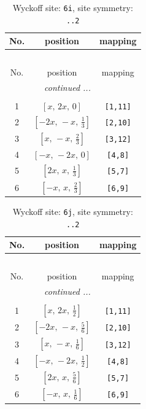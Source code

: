 \documentclass[fleqn,8pt]{jsarticle}
\begin{document}
\renewcommand{\arraystretch}{1.2}
\begin{longtable}{ccc}
\caption{Wyckoff site: {\tt 6i}, site symmetry: {\tt ..2}}
 \\
 \hline \hline
No. & position & mapping \\ \hline \endfirsthead

\multicolumn{2}{l}{\tablename\ \thetable{}} \\
 \hline \hline
No. & position & mapping \\ \hline \endhead

 \hline \hline
\multicolumn{2}{r}{\footnotesize\it continued ...} \\ \endfoot

 \hline \hline
\multicolumn{2}{r}{} \\ \endlastfoot

1 & $\left[ x,\, 2 x,\, 0 \right]$ & {\tt [1,11]} \\ \hline
2 & $\left[ - 2 x,\, - x,\, \frac{1}{3} \right]$ & {\tt [2,10]} \\ \hline
3 & $\left[ x,\, - x,\, \frac{2}{3} \right]$ & {\tt [3,12]} \\ \hline
4 & $\left[ - x,\, - 2 x,\, 0 \right]$ & {\tt [4,8]} \\ \hline
5 & $\left[ 2 x,\, x,\, \frac{1}{3} \right]$ & {\tt [5,7]} \\ \hline
6 & $\left[ - x,\, x,\, \frac{2}{3} \right]$ & {\tt [6,9]} \\
\end{longtable}
\renewcommand{\arraystretch}{1.2}
\begin{longtable}{ccc}
\caption{Wyckoff site: {\tt 6j}, site symmetry: {\tt ..2}}
 \\
 \hline \hline
No. & position & mapping \\ \hline \endfirsthead

\multicolumn{2}{l}{\tablename\ \thetable{}} \\
 \hline \hline
No. & position & mapping \\ \hline \endhead

 \hline \hline
\multicolumn{2}{r}{\footnotesize\it continued ...} \\ \endfoot

 \hline \hline
\multicolumn{2}{r}{} \\ \endlastfoot

1 & $\left[ x,\, 2 x,\, \frac{1}{2} \right]$ & {\tt [1,11]} \\ \hline
2 & $\left[ - 2 x,\, - x,\, \frac{5}{6} \right]$ & {\tt [2,10]} \\ \hline
3 & $\left[ x,\, - x,\, \frac{1}{6} \right]$ & {\tt [3,12]} \\ \hline
4 & $\left[ - x,\, - 2 x,\, \frac{1}{2} \right]$ & {\tt [4,8]} \\ \hline
5 & $\left[ 2 x,\, x,\, \frac{5}{6} \right]$ & {\tt [5,7]} \\ \hline
6 & $\left[ - x,\, x,\, \frac{1}{6} \right]$ & {\tt [6,9]} \\
\end{longtable}
\end{document}

